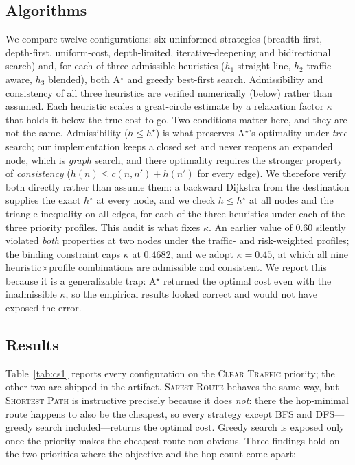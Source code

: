 \documentclass[10pt]{article}
\begin{document}
\subsection{Algorithms}
We compare twelve configurations: six uninformed strategies (breadth-first,
depth-first, uniform-cost, depth-limited, iterative-deepening and bidirectional
search) and, for each of three admissible heuristics ($h_1$ straight-line,
$h_2$ traffic-aware, $h_3$ blended), both A$^\star$ and greedy best-first search.
Admissibility and consistency of all three heuristics are verified numerically
(below) rather than assumed.
Each heuristic scales a great-circle estimate by a relaxation factor
$\kappa$ that holds it below the true cost-to-go. Two conditions matter here, and
they are not the same. Admissibility ($h\le h^{\star}$) is what preserves
A$^\star$'s optimality under \emph{tree} search; our implementation keeps a closed
set and never reopens an expanded node, which is \emph{graph} search, and there
optimality requires the stronger property of \emph{consistency}
($h(n)\le c(n,n')+h(n')$ for every edge). We therefore verify both directly rather
than assume them: a backward Dijkstra from the destination supplies the exact
$h^{\star}$ at every node, and we check $h\le h^{\star}$ at all nodes and the
triangle inequality on all edges, for each of the three heuristics under each of
the three priority profiles. This audit is what fixes $\kappa$. An earlier value
of $0.60$ silently violated \emph{both} properties at two nodes under the
traffic- and risk-weighted profiles; the binding constraint caps $\kappa$ at
$0.4682$, and we adopt $\kappa=0.45$, at which all nine heuristic$\times$profile
combinations are admissible and consistent. We report this because it is a
generalizable trap: A$^\star$ returned the optimal cost even with the
inadmissible $\kappa$, so the empirical results looked correct and would not have
exposed the error.

\subsection{Results}
Table~\ref{tab:cs1} reports every configuration on the \textsc{Clear Traffic}
priority; the other two are shipped in the artifact. \textsc{Safest Route} behaves
the same way, but \textsc{Shortest Path} is instructive precisely because it does
\emph{not}: there the hop-minimal route happens to also be the cheapest, so every
strategy except BFS and DFS---greedy search included---returns the optimal cost.
Greedy search is exposed only once the priority makes the cheapest route
non-obvious. Three findings hold on the two priorities where the objective and the
hop count come apart:
\end{document}
